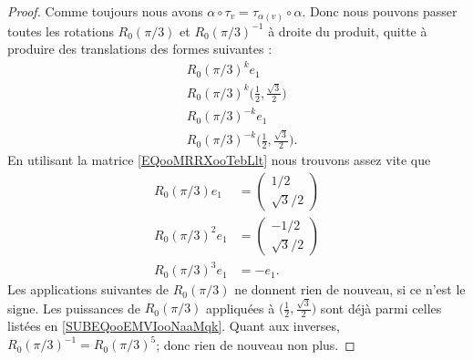 \begin{proof}
	Comme toujours nous avons \( \alpha\circ\tau_v=\tau_{\alpha(v)}\circ \alpha\). Donc nous pouvons passer toutes les rotations \( R_0(\pi/3)\) et \( R_0(\pi/3)^{-1}\) à droite du produit, quitte à produire des translations des formes suivantes :
	\begin{subequations}
		\begin{align}
			& R_0(\pi/3)^ke_1                                                   \\
			& R_0(\pi/3)^k\big( \frac{ 1 }{2},\frac{ \sqrt{ 3 } }{2} \big)      \\
			& R_0(\pi/3)^{-k}e_1                                                \\
			& R_0(\pi/3)^{-k}\big( \frac{ 1 }{2},\frac{ \sqrt{ 3 } }{2} \big).
		\end{align}
	\end{subequations}
	En utilisant la matrice \eqref{EQooMRRXooTebLlt} nous trouvons assez vite que
	\begin{subequations}        \label{SUBEQooEMVIooNaaMqk}
		\begin{align}
			R_0(\pi/3)e_1   & =\begin{pmatrix}
				1/2 \\
				\sqrt{ 3 }/2
			\end{pmatrix} \\
			R_0(\pi/3)^2e_1 & =\begin{pmatrix}
				-1/2 \\
				\sqrt{ 3 }/2
			\end{pmatrix} \\
			R_0(\pi/3)^3e_1 & =-e_1.
		\end{align}
	\end{subequations}
	Les applications suivantes de \( R_0(\pi/3)\) ne donnent rien de nouveau, si ce n'est le signe. Les puissances de \( R_0(\pi/3)\) appliquées à \( \big( \frac{ 1 }{2},\frac{ \sqrt{ 3 } }{2} \big)\) sont déjà parmi celles listées en \eqref{SUBEQooEMVIooNaaMqk}. Quant aux inverses, \( R_0(\pi/3)^{-1}=R_0(\pi/3)^5\); donc rien de nouveau non plus.


\end{proof}
